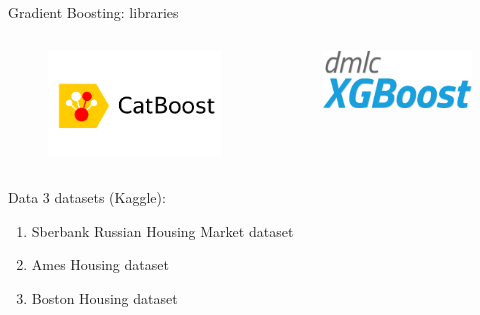 \begin{frame}{Gradient Boosting: libraries}
\begin{columns}
		
		\begin{column}{0.33\textwidth}
			\centering
			\begin{figure}
				\includegraphics[width=\columnwidth]{figures/catboost}
			\end{figure}
		\end{column}
		
		\begin{column}{0.33\textwidth}
			\centering
			\begin{figure}
				\includegraphics[width=\columnwidth]{figures/xgboost}
			\end{figure}
		\end{column}
		
	\end{columns}
\end{frame}


\begin{frame}{Data}
	3 datasets (Kaggle):
	\begin{enumerate}
		\item Sberbank Russian Housing Market dataset 
		\item Ames Housing dataset 
		\item Boston Housing dataset 
	\end{enumerate}
\end{frame}
